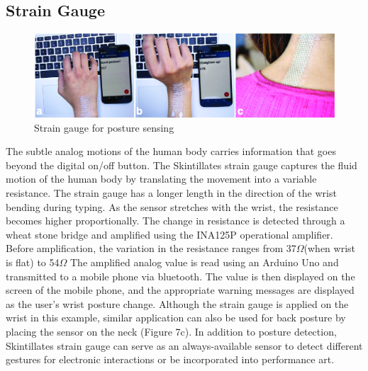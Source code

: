 \documentclass{sigchi}
\begin{document}
\subsection {Strain Gauge}
\begin{figure}
\centering
\includegraphics[width=1.0\textwidth]{figures/Figure10}
\caption{Strain gauge for posture sensing}
\vspace{-8pt}
\label{fig:figure9}
\end{figure}
The subtle analog motions of the human body carries information that goes beyond the digital on/off button. The Skintillates strain gauge captures the fluid motion of the human body by translating the movement into a variable resistance. %
 The strain gauge has a longer length in the direction of the wrist bending during typing. As the sensor stretches with the wrist, the resistance becomes higher proportionally. The change in resistance is detected through a wheat stone bridge and amplified using the INA125P operational amplifier. Before amplification, the variation in the resistance ranges from 37$\Omega$(when wrist is flat) to 54$\Omega$ The amplified analog value is read using an Arduino Uno and transmitted to a mobile phone via bluetooth. 
 The value is then displayed on the screen of the mobile phone, and the appropriate warning messages are displayed as the user’s wrist posture change. Although the strain gauge is applied on the wrist in this example, similar application can also be used for back posture by placing the sensor on the neck (Figure 7c). In addition to posture detection, Skintillates strain gauge can serve as an always-available sensor to detect different gestures for electronic interactions or be incorporated into performance art. 
\end{document}
